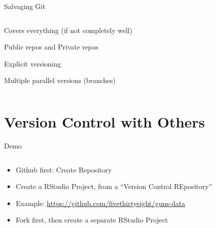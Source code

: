 \documentclass[ignorenonframetext,notes, 10pt, aspectratio=169]{beamer}
\begin{document}
\begin{frame}{Salvaging Git}
\begin{columns}[T]
\begin{column}{0.6\textwidth}
\begin{wideitemize}
\item Covers everything (if not completely well)
\item Public repos and Private repos
\item Explicit versioning
\item Multiple parallel versions (branches) 
\end{wideitemize}
\end{column}
\end{columns}
\end{frame}

\section{Version Control with Others}


\begin{frame}{Demo}
\begin{columns}[T]
\begin{column}{0.5\textwidth}
\begin{itemize}
\item Github first: Create Repository
\item Create a RStudio Project, from a ``Version Control REpository''
\end{itemize}


\begin{itemize}
\item Example: \url{https://github.com/fivethirtyeight/guns-data}
\item Fork first, then create a separate RStudio Project
\end{itemize}
\end{column}
\end{columns}
\end{frame}
\end{document}
